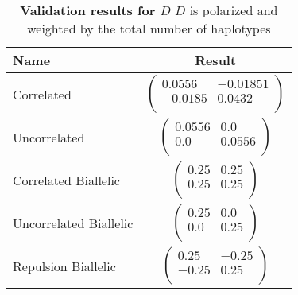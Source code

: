 \documentclass[12pt]{article}
\begin{document}
\begin{table}[H]
  \begin{tabular}{lc} Name & Result \\
    \hline
    Correlated & $\left(\begin{array}{cc}
                          0.0556 & -0.01851 \\
                          -0.0185 & 0.0432 \\
                        \end{array}\right)$ \\
    Uncorrelated & $\left(\begin{array}{cc}
                            0.0556 & 0.0 \\
                            0.0 & 0.0556 \\
                          \end{array}\right)$ \\
    Correlated Biallelic & $\left(\begin{array}{cc}
                                    0.25 & 0.25 \\
                                    0.25 & 0.25 \\
                                  \end{array}\right)$ \\
    Uncorrelated Biallelic & $\left(\begin{array}{cc}
                                      0.25 & 0.0 \\
                                      0.0 & 0.25 \\
                                    \end{array}\right)$ \\
    Repulsion Biallelic & $\left(\begin{array}{cc}
                                   0.25 & -0.25 \\
                                   -0.25 & 0.25 \\
                                 \end{array}\right)$ \\
  \end{tabular}
  \caption{
    \textbf{Validation results for $D$}
    $D$ is polarized and weighted by the total number of haplotypes
  }
\end{table}
\end{document}
